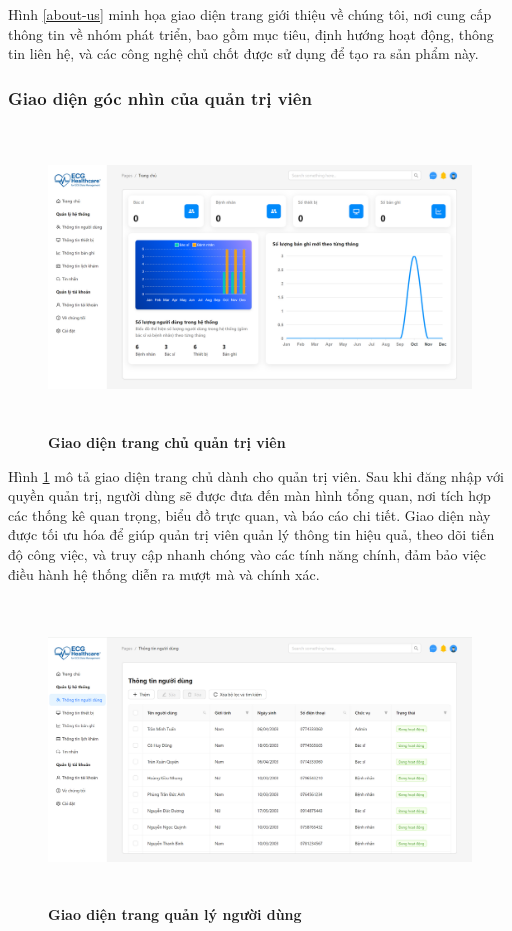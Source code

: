 Hình \ref{about-us} minh họa giao diện trang giới thiệu về chúng tôi, nơi cung cấp thông tin về nhóm phát triển, bao gồm mục tiêu,
định hướng hoạt động, thông tin liên hệ, và các công nghệ chủ chốt được sử dụng để tạo ra sản phẩm này.

\subsubsection{Giao diện góc nhìn của quản trị viên}
\begin{figure}[H]
	\centering
	\includegraphics[width=15cm,height=8cm]{Images/admin_ui/home.png}
	\caption[Giao diện trang chủ quản trị viên]{\bfseries \fontsize{12pt}{0pt}\selectfont Giao diện trang chủ quản trị viên}
	\label{home-admin}
\end{figure}

Hình \ref{home-admin} mô tả giao diện trang chủ dành cho quản trị viên. Sau khi đăng nhập với quyền quản trị, người dùng sẽ được đưa đến màn hình tổng quan,
nơi tích hợp các thống kê quan trọng, biểu đồ trực quan, và báo cáo chi tiết. Giao diện này được tối ưu hóa để giúp quản trị viên quản lý thông tin hiệu quả,
theo dõi tiến độ công việc, và truy cập nhanh chóng vào các tính năng chính, đảm bảo việc điều hành hệ thống diễn ra mượt mà và chính xác.

\begin{figure}[H]
	\centering
	\includegraphics[width=15cm,height=8cm]{Images/admin_ui/users.png}
	\caption[Giao diện trang quản lý người dùng]{\bfseries \fontsize{12pt}{0pt}\selectfont Giao diện trang quản lý người dùng}
	\label{users-admin}
\end{figure}

